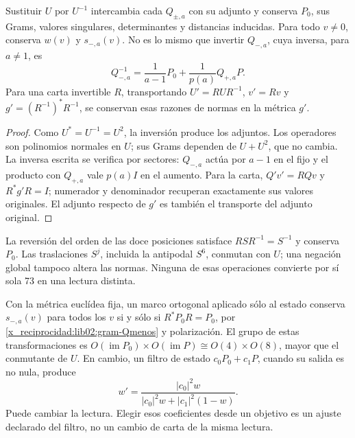 \begin{proposition}
\label{x_reciprocidad:lib02:inversion-carta}
Sustituir \(U\) por \(U^{-1}\) intercambia cada \(Q_{\pm,a}\)
con su adjunto y conserva \(P_0\), sus Grams, valores singulares,
determinantes y distancias inducidas. Para todo \(v\ne0\), conserva
\(w(v)\) y \(s_{-,a}(v)\). No es lo mismo que invertir
\(Q_{-,a}\), cuya inversa, para \(a\ne1\), es
\begin{equation}
 Q_{-,a}^{-1}
 =\frac1{a-1}P_0+\frac1{p(a)}Q_{+,a}P.
 \label{x_reciprocidad:lib02:inversa-Q}
\end{equation}
Para una carta invertible \(R\), transportando
\(U'=RUR^{-1}\), \(v'=Rv\) y
\(g'=(R^{-1})^*R^{-1}\), se conservan esas razones de normas en
la métrica \(g'\).
\end{proposition}
\begin{proof}
Como \(U^*=U^{-1}=U^2\), la inversión produce los adjuntos.
Los operadores son polinomios normales en \(U\); sus Grams dependen
de \(U+U^2\), que no cambia. La inversa escrita se verifica por
sectores: \(Q_{-,a}\) actúa por \(a-1\) en el fijo y el producto
con \(Q_{+,a}\) vale \(p(a)I\) en el aumento. Para la carta,
\(Q'v'=RQv\) y \(R^*g'R=I\); numerador y denominador recuperan
exactamente sus valores originales. El adjunto respecto de \(g'\)
es también el transporte del adjunto original.
\end{proof}

La reversión del orden de las doce posiciones satisface
\(RSR^{-1}=S^{-1}\) y conserva \(P_0\). Las traslaciones \(S^j\),
incluida la antipodal \(S^6\), conmutan con \(U\); una negación
global tampoco altera las normas. Ninguna de esas operaciones convierte
por sí sola 73 en una lectura distinta.

Con la métrica euclídea fija, un marco ortogonal aplicado sólo al estado
conserva \(s_{-,a}(v)\) para todos los \(v\) si y sólo si
\(R^*P_0R=P_0\), por \eqref{x_reciprocidad:lib02:gram-Qmenos} y polarización.
El grupo de estas transformaciones es
\(O(\operatorname{im}P_0)\times O(\operatorname{im}P)
\cong O(4)\times O(8)\), mayor que el conmutante de \(U\).
En cambio, un filtro de estado
\(c_0P_0+c_1P\), cuando su salida es no nula, produce
\begin{equation}
 w'=
 \frac{|c_0|^2w}{|c_0|^2w+|c_1|^2(1-w)}.
 \label{x_reciprocidad:lib02:filtro-pesos}
\end{equation}
Puede cambiar la lectura. Elegir esos coeficientes desde un objetivo es
un ajuste declarado del filtro, no un cambio de carta de la misma
lectura.

